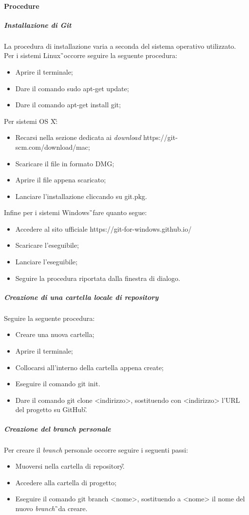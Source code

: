 \paragraph{Procedure} 
\subparagraph{Installazione di Git} La procedura di installazione varia a seconda del sistema operativo utilizzato.\\
Per i sistemi Linux\G\ occorre seguire la seguente procedura:
\begin{itemize}
\item Aprire il terminale;
\item Dare il comando sudo apt-get update;
\item Dare il comando apt-get install git;
\end{itemize}
Per sistemi OS X\G:
\begin{itemize}
\item Recarsi nella sezione dedicata ai \textit{download} https://git-scm.com/download/mac;
\item Scaricare il file in formato DMG;
\item Aprire il file appena scaricato;
\item Lanciare l'installazione cliccando su git.pkg.
\end{itemize}
Infine per i sistemi Windows\G\ fare quanto segue:
\begin{itemize}
\item Accedere al sito ufficiale https://git-for-windows.github.io/
\item Scaricare l'eseguibile;
\item Lanciare l'eseguibile;
\item Seguire la procedura riportata dalla finestra di dialogo.
\end{itemize}

\subparagraph{Creazione di una cartella locale di repository} Seguire la seguente procedura:
\begin{itemize}
\item Creare una nuova cartella;
\item Aprire il terminale;
\item Collocarsi all'interno della cartella appena create;
\item Eseguire il comando git init.
\item Dare il comando git clone <indirizzo>, sostituendo con <indirizzo> l'URL del progetto su GitHub\G.
\end{itemize}

\subparagraph{Creazione del branch personale} Per creare il \textit{branch} personale occorre seguire i seguenti passi:
\begin{itemize}
\item Muoversi nella cartella di repository\G.
\item Accedere alla cartella di progetto;
\item Eseguire il comando git branch <nome>, sostituendo a <nome> il nome del nuovo \textit{branch}\G\ da creare.
\end{itemize}

